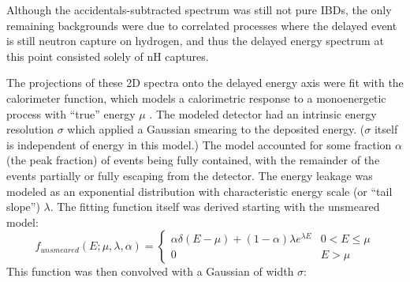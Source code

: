 
Although the accidentals-subtracted spectrum was still not pure IBDs,
the only remaining backgrounds were due to correlated processes
where the delayed event is still
neutron capture on hydrogen, and thus
the delayed energy spectrum at this point
consisted solely of nH captures.

The projections of these 2D spectra onto the delayed energy axis
were fit with the calorimeter function, which models
a calorimetric response to a monoenergetic process with ``true''
energy $\mu$ \cite{calorimeter2016}.
The modeled detector had an intrinsic energy resolution $\sigma$
which applied a Gaussian smearing to the deposited energy.
($\sigma$ itself is independent of energy in this model.)
The model accounted for some fraction $\alpha$ (the peak fraction)
of events being fully contained,
with the remainder of the events partially or fully escaping from the detector.
The energy leakage was modeled as an exponential distribution
with characteristic energy scale (or ``tail slope'') $\lambda$.
The fitting function itself was derived starting with
the unsmeared model:
\begin{equation}
    f_{unsmeared}(E;\mu,\lambda,\alpha) =
    \begin{cases}
        \alpha\delta(E-\mu) + (1-\alpha)\lambda e^{\lambda E}
        & 0 < E \leq \mu \\
        0 & E > \mu
    \end{cases}
\end{equation}
This function was then convolved with a Gaussian
of width $\sigma$:
